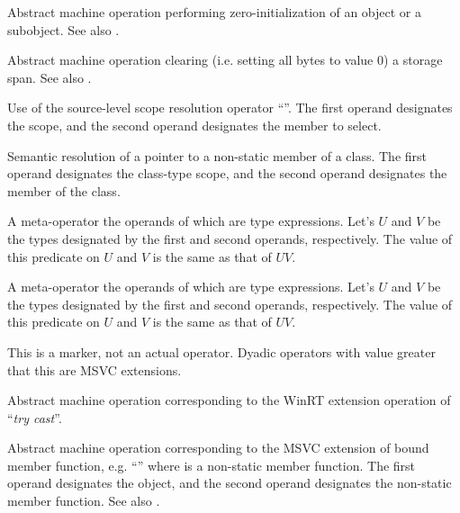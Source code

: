 Abstract machine operation performing zero-initialization of an object or a subobject.
See also .

Abstract machine operation clearing (i.e. setting all bytes to value $0$) a storage span.
See also .

Use of the source-level scope resolution operator ``\code{::}''.
The first operand designates the scope, and the second operand designates the member to select.

Semantic resolution of a pointer to a non-static member of a class.  The first operand designates the class-type scope, 
and the second operand designates the member of the class.

A meta-operator the operands of which are type expressions.  Let's $U$ and $V$ be the types designated by the first and second operands, respectively.
The value of this predicate on $U$ and $V$ is the same as that of $U$\code{, }$V$\code{>}.

A meta-operator the operands of which are type expressions.  Let's $U$ and $V$ be the types designated by the first and second operands, respectively.
The value of this predicate on $U$ and $V$ is the same as that of $U$\code{, }$V$\code{>}.


This is a marker, not an actual operator. Dyadic operators with 
value greater that this are MSVC extensions.

Abstract machine operation corresponding to the WinRT extension operation of ``\emph{try cast}''.

Abstract machine operation corresponding to the MSVC extension of bound member function, 
e.g. ``'' where  is a non-static member function.  
The first operand designates the object,
and the second operand designates the non-static member function.
See also .

